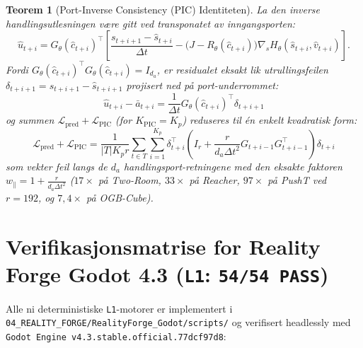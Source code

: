 \documentclass[11pt,a4paper,oneside]{book}
\newtheorem{teorem}{Teorem}[chapter]
\theoremstyle{definition}
\begin{document}
\begin{teorem}[Port-Inverse Consistency (PIC) Identiteten]
La den inverse handlingsutlesningen være gitt ved transponatet av inngangsporten:
\begin{equation}
\hat{u}_{t+i} = G_\theta(\hat{c}_{t+i})^\top\left[\frac{s_{t+i+1} - \hat{s}_{t+i}}{\Delta t} - \big(J - R_\theta(\hat{c}_{t+i})\big)\nabla_s H_\theta(\hat{s}_{t+i}, \hat{v}_{t+i})\right].
\end{equation}
Fordi $G_\theta(\hat{c}_{t+i})^\top G_\theta(\hat{c}_{t+i}) = I_{d_a}$, er residualet eksakt lik utrullingsfeilen $\delta_{t+i+1} = s_{t+i+1} - \hat{s}_{t+i+1}$ projisert ned på port-underrommet:
\begin{equation}
\boxed{\hat{u}_{t+i} - \bar{a}_{t+i} = \frac{1}{\Delta t}G_\theta(\hat{c}_{t+i})^\top \delta_{t+i+1}}
\end{equation}
og summen $\mathcal{L}_{\text{pred}} + \mathcal{L}_{\text{PIC}}$ (for $K_{\text{PIC}} = K_p$) reduseres til én enkelt kvadratisk form:
\begin{equation}
\boxed{\mathcal{L}_{\text{pred}} + \mathcal{L}_{\text{PIC}} = \frac{1}{|T|K_p r}\sum_{t\in T}\sum_{i=1}^{K_p} \delta_{t+i}^\top\left(I_r + \frac{r}{d_a \Delta t^2}G_{t+i-1}G_{t+i-1}^\top\right)\delta_{t+i}}
\end{equation}
som vekter feil langs de $d_a$ handlingsport-retningene med den eksakte faktoren $w_\parallel = 1 + \frac{r}{d_a\Delta t^2}$ ($17\times$ på Two-Room, $33\times$ på Reacher, $97\times$ på PushT ved $r=192$, og $7,4\times$ på OGB-Cube).
\end{teorem}

\chapter{Verifikasjonsmatrise for Reality Forge Godot 4.3 (\texttt{L1}: \texttt{54/54 PASS})}

Alle ni deterministiske \texttt{L1}-motorer er implementert i \texttt{04\_REALITY\_FORGE/RealityForge\_Godot/scripts/} og verifisert headlessly med \texttt{Godot Engine v4.3.stable.official.77dcf97d8}:
\end{document}
